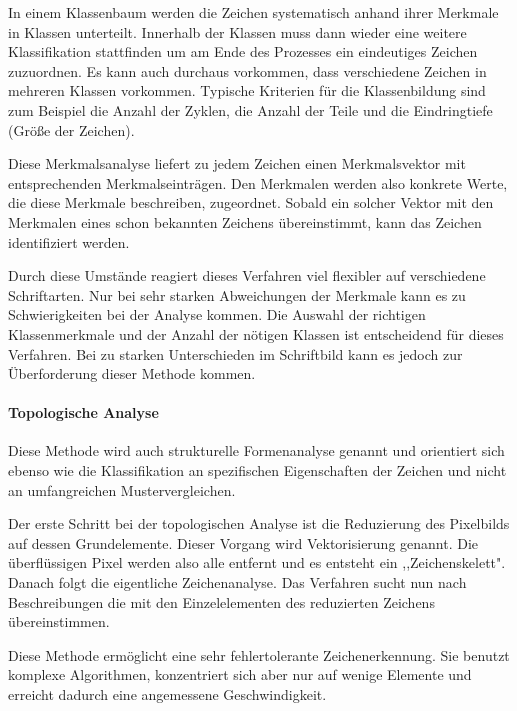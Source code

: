
In einem Klassenbaum werden die Zeichen systematisch anhand ihrer Merkmale in Klassen unterteilt. Innerhalb der Klassen muss dann wieder eine weitere Klassifikation stattfinden um am Ende des Prozesses ein eindeutiges Zeichen zuzuordnen. Es kann auch durchaus vorkommen, dass verschiedene Zeichen in mehreren Klassen vorkommen. Typische Kriterien für die Klassenbildung sind zum Beispiel die Anzahl der Zyklen, die Anzahl der Teile und die Eindringtiefe (Größe der Zeichen).

Diese Merkmalsanalyse liefert zu jedem Zeichen einen Merkmalsvektor mit entsprechenden Merkmalseinträgen. Den Merkmalen werden also konkrete Werte, die diese Merkmale beschreiben, zugeordnet. Sobald ein solcher Vektor mit den Merkmalen eines schon bekannten Zeichens übereinstimmt, kann das Zeichen identifiziert werden.

Durch diese Umstände reagiert dieses Verfahren viel flexibler auf verschiedene Schriftarten. Nur bei sehr starken Abweichungen der Merkmale kann es zu Schwierigkeiten bei der Analyse kommen. Die Auswahl der richtigen Klassenmerkmale und der Anzahl der nötigen Klassen ist entscheidend für dieses Verfahren. Bei zu starken Unterschieden im Schriftbild kann es jedoch zur Überforderung dieser Methode kommen.

\paragraph{Topologische Analyse}

Diese Methode wird auch strukturelle Formenanalyse genannt und orientiert sich ebenso wie die Klassifikation an spezifischen Eigenschaften der Zeichen und nicht an umfangreichen Mustervergleichen.

Der erste Schritt bei der topologischen Analyse ist die Reduzierung des Pixelbilds auf dessen Grundelemente. Dieser Vorgang wird Vektorisierung genannt. Die überflüssigen Pixel werden also alle entfernt und es entsteht ein ,,Zeichenskelett". Danach folgt die eigentliche Zeichenanalyse. Das Verfahren sucht nun nach Beschreibungen die mit den Einzelelementen des reduzierten Zeichens übereinstimmen. 


Diese Methode ermöglicht eine sehr fehlertolerante Zeichenerkennung. Sie benutzt komplexe Algorithmen, konzentriert sich aber nur auf wenige Elemente und erreicht dadurch eine angemessene Geschwindigkeit.

